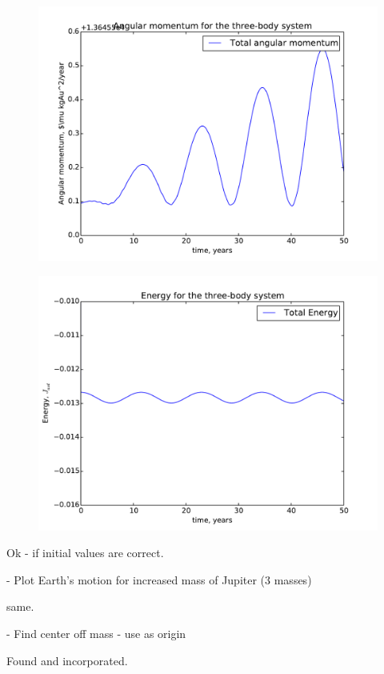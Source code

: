 \begin{figure}[H]
	\centering
	\includegraphics[width=0.9\linewidth]{../results/plots/3bodyCentric_angular}
	\caption{}
	\label{fig:3bodycentricangular}
\end{figure}

\begin{figure}[H]
	\centering
	\includegraphics[width=0.9\linewidth]{../results/plots/3bodyCentric_energy}
	\caption{}
	\label{fig:3bodycentricenergy}
\end{figure}


	Ok - if initial values are correct.
	
	- Plot Earth's motion for increased mass of Jupiter (3 masses)

	same.	
	
	- Find center off mass - use as origin

	Found and incorporated.	
	
